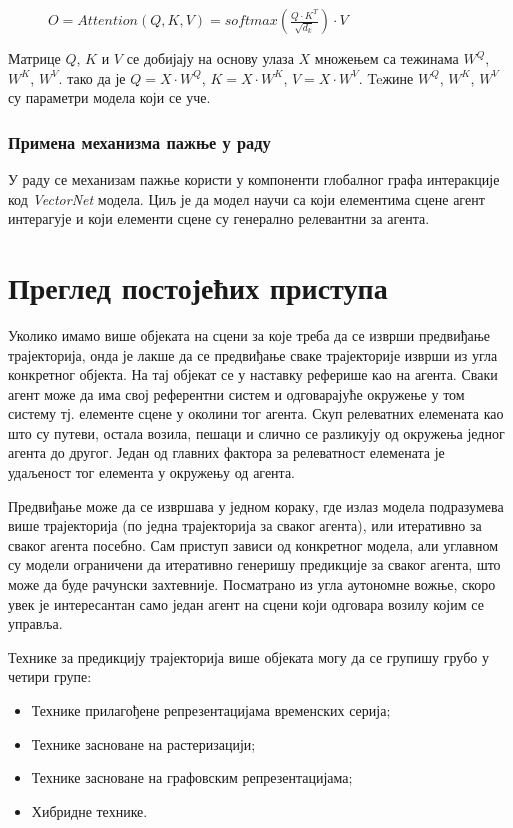 \documentclass[11pt,oneside]{memoir}
\begin{document}
\begin{figure}[H]
  \centering
  $O = Attention(Q, K, V) = softmax(\frac{Q\cdot K^T}{\sqrt{d_k}})\cdot V$
\end{figure}

Матрице $Q$, $K$ и $V$ се добијају на основу улаза $X$ множењем са тежинама $W^{Q}$, $W^{K}$, $W^{V}$. тако да је $Q = X\cdot W^{Q}$, $K = X\cdot W^{K}$,
$V = X\cdot W^{V}$. Teжине $W^{Q}$, $W^{K}$, $W^{V}$ су параметри модела који се уче.

\subsection{Примена механизма пажње у раду}

У раду се механизам пажње користи у компоненти глобалног графа интеракције код \textit{VectorNet} модела. Циљ је да модел научи
са који елементима сцене агент интерагује и који елементи сцене су генерално релевантни за агента. 

\chapter{Преглед постојећих приступа}
\label{chp:razrada}

Уколико имамо више објеката на сцени за које треба да се изврши предвиђање трајекторија, онда је лакше да се предвиђање сваке 
трајекторије изврши из угла конкретног објекта. На тај објекат се у наставку реферише као на агента.
Сваки агент може да има свој референтни систем
и одговарајуће окружење у том систему тј. елементе сцене у околини тог агента. Скуп релеватних елемената као што су путеви, остала возила, пешаци и слично се
разликују од окружења једног агента до другог. Један од главних фактора за релеватност елемената је удаљеност тог елемента у окружењу од агента.

Предвиђање може да се извршава у једном кораку, где излаз модела подразумева више трајекторија (по једна трајекторија за сваког агента), 
или итеративно за сваког агента посебно. Сам приступ зависи од конкретног модела, 
али углавном су модели ограничени да итеративно генеришу предикције за сваког агента, што може да буде рачунски захтевније. 
Посматрано из угла аутономне вожње, скоро увек је интересантан само један агент на сцени који одговара возилу којим се управља.

Технике за предикцију трајекторија више објеката могу да се групишу грубо у четири групе:
\begin{itemize}
  \item Технике прилагођене репрезентацијама временских серија;
  \item Технике засноване на растеризацији;
  \item Технике засноване на графовским репрезентацијама;
  \item Хибридне технике.
\end{itemize}
\end{document}
